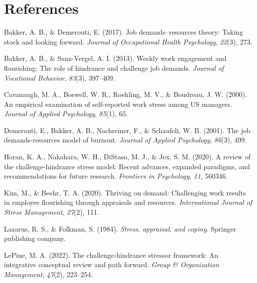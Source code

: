 \documentclass[
  jou]{apa6}
\newlength{\cslhangindent}
\newlength{\cslentryspacingunit} %
\newenvironment{CSLReferences}[2] %
 {%
  \setlength{\parindent}{0pt}
  \ifodd #1
  \let\oldpar\par
  \def\par{\hangindent=\cslhangindent\oldpar}
  \fi
  \setlength{\parskip}{#2\cslentryspacingunit}
 }%
 {}
\begin{document}
\hypertarget{references}{%
\section*{References}\label{references}}

\hypertarget{refs}{}
\begin{CSLReferences}{1}{0}
\leavevmode{}%
Bakker, A. B., \& Demerouti, E. (2017). Job demands--resources theory: Taking stock and looking forward. \emph{Journal of Occupational Health Psychology}, \emph{22}(3), 273.

\leavevmode{}%
Bakker, A. B., \& Sanz-Vergel, A. I. (2013). Weekly work engagement and flourishing: The role of hindrance and challenge job demands. \emph{Journal of Vocational Behavior}, \emph{83}(3), 397--409.

\leavevmode{}%
Cavanaugh, M. A., Boswell, W. R., Roehling, M. V., \& Boudreau, J. W. (2000). An empirical examination of self-reported work stress among US managers. \emph{Journal of Applied Psychology}, \emph{85}(1), 65.

\leavevmode{}%
Demerouti, E., Bakker, A. B., Nachreiner, F., \& Schaufeli, W. B. (2001). The job demands-resources model of burnout. \emph{Journal of Applied Psychology}, \emph{86}(3), 499.

\leavevmode{}%
Horan, K. A., Nakahara, W. H., DiStaso, M. J., \& Jex, S. M. (2020). A review of the challenge-hindrance stress model: Recent advances, expanded paradigms, and recommendations for future research. \emph{Frontiers in Psychology}, \emph{11}, 560346.

\leavevmode{}%
Kim, M., \& Beehr, T. A. (2020). Thriving on demand: Challenging work results in employee flourishing through appraisals and resources. \emph{International Journal of Stress Management}, \emph{27}(2), 111.

\leavevmode{}%
Lazarus, R. S., \& Folkman, S. (1984). \emph{Stress, appraisal, and coping}. Springer publishing company.

\leavevmode{}%
LePine, M. A. (2022). The challenge-hindrance stressor framework: An integrative conceptual review and path forward. \emph{Group \& Organization Management}, \emph{47}(2), 223--254.


\end{CSLReferences}
\end{document}
